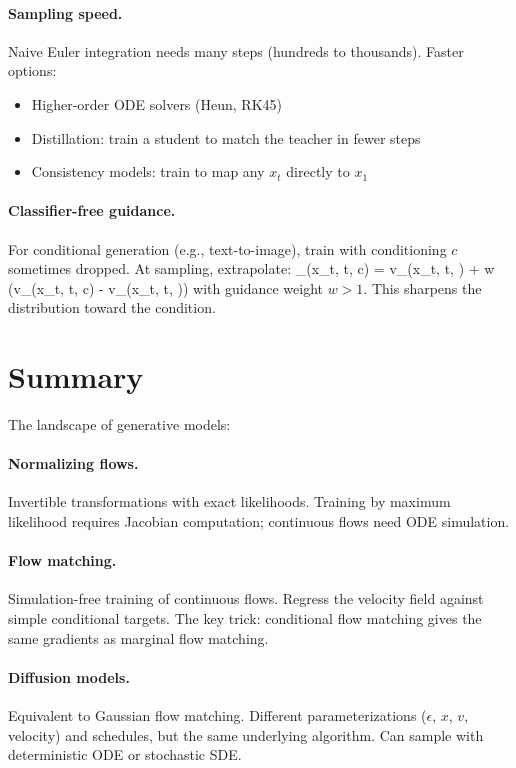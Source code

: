 \documentclass[11pt]{article}
\begin{document}
\paragraph{Sampling speed.} Naive Euler integration needs many steps (hundreds to thousands). Faster options:
\begin{itemize}
\item Higher-order ODE solvers (Heun, RK45)
\item Distillation: train a student to match the teacher in fewer steps
\item Consistency models: train to map any $x_t$ directly to $x_1$
\end{itemize}

\paragraph{Classifier-free guidance.} For conditional generation (e.g., text-to-image), train with conditioning $c$ sometimes dropped. At sampling, extrapolate:
\beq
{}_\theta(x_t, t, c) = v_\theta(x_t, t, \varnothing) + w \cdot (v_\theta(x_t, t, c) - v_\theta(x_t, t, \varnothing))
\eeq
with guidance weight $w > 1$. This sharpens the distribution toward the condition.

\section{Summary}

The landscape of generative models:

\paragraph{Normalizing flows.} Invertible transformations with exact likelihoods. Training by maximum likelihood requires Jacobian computation; continuous flows need ODE simulation.

\paragraph{Flow matching.} Simulation-free training of continuous flows. Regress the velocity field against simple conditional targets. The key trick: conditional flow matching gives the same gradients as marginal flow matching.

\paragraph{Diffusion models.} Equivalent to Gaussian flow matching. Different parameterizations ($\epsilon$, $x$, $v$, velocity) and schedules, but the same underlying algorithm. Can sample with deterministic ODE or stochastic SDE.
\end{document}
